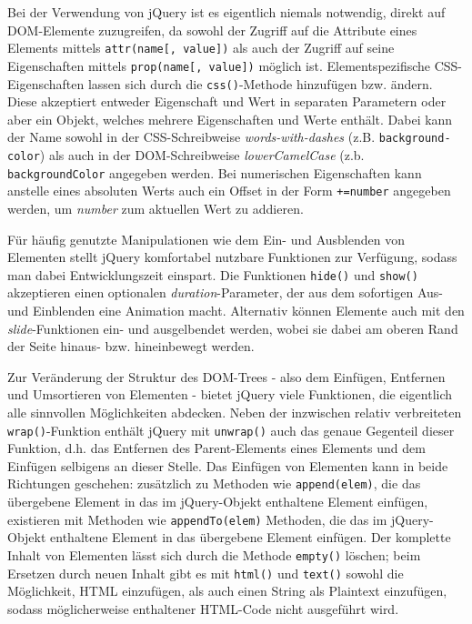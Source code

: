 \begin{description}
Bei der Verwendung von jQuery ist es eigentlich niemals notwendig, direkt auf DOM-Elemente
zuzugreifen, da sowohl der Zugriff auf die Attribute eines Elements mittels
\lstinline{attr(name[, value])} als auch der Zugriff auf seine Eigenschaften mittels
\lstinline{prop(name[, value])} möglich ist.
Elementspezifische CSS-Eigenschaften lassen sich durch die \lstinline{css()}-Methode hinzufügen bzw.
ändern. Diese akzeptiert entweder Eigenschaft und Wert in separaten Parametern oder aber ein Objekt,
welches mehrere Eigenschaften und Werte enthält. Dabei kann der Name sowohl in der CSS-Schreibweise
\emph{words-with-dashes} (z.B. \lstinline{background-color}) als auch in der DOM-Schreibweise
\emph{lowerCamelCase} (z.b. \lstinline{backgroundColor} angegeben werden. Bei numerischen
Eigenschaften kann anstelle eines absoluten Werts auch ein Offset in der Form \lstinline{+=number}
angegeben werden, um \emph{number} zum aktuellen Wert zu addieren.

Für häufig genutzte Manipulationen wie dem Ein- und Ausblenden von Elementen stellt jQuery
komfortabel nutzbare Funktionen zur Verfügung, sodass man dabei Entwicklungszeit einspart. Die
Funktionen \lstinline{hide()} und \lstinline{show()} akzeptieren einen optionalen
\emph{duration}-Parameter, der aus dem sofortigen Aus- und Einblenden eine Animation macht.
Alternativ können Elemente auch mit den \emph{slide}-Funktionen ein- und ausgelbendet werden, wobei
sie dabei am oberen Rand der Seite hinaus- bzw. hineinbewegt werden.

Zur Veränderung der Struktur des DOM-Trees - also dem Einfügen, Entfernen und Umsortieren von
Elementen - bietet jQuery viele Funktionen, die eigentlich alle sinnvollen Möglichkeiten abdecken.
Neben der inzwischen relativ verbreiteten \lstinline{wrap()}-Funktion enthält jQuery mit
\lstinline{unwrap()} auch das genaue Gegenteil dieser Funktion, d.h. das Entfernen des
Parent-Elements eines Elements und dem Einfügen selbigens an dieser Stelle. Das Einfügen von
Elementen kann in beide Richtungen geschehen: zusätzlich zu Methoden wie \lstinline{append(elem)},
die das übergebene Element in das im jQuery-Objekt enthaltene Element einfügen, existieren mit
Methoden wie \lstinline{appendTo(elem)} Methoden, die das im jQuery-Objekt enthaltene Element in das
übergebene Element einfügen. Der komplette Inhalt von Elementen lässt sich durch die Methode
\lstinline{empty()} löschen; beim Ersetzen durch neuen Inhalt gibt es mit \lstinline{html()} und
\lstinline{text()} sowohl die Möglichkeit, HTML einzufügen, als auch einen String als Plaintext
einzufügen, sodass möglicherweise enthaltener HTML-Code nicht ausgeführt wird.


\end{description}
